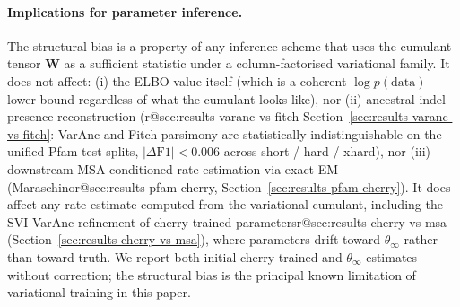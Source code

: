 \paragraph{Implications for parameter inference.}
The structural bias is a property of any inference scheme that
uses the cumulant tensor $\mathbf{W}$ as a sufficient statistic
under a column-factorised variational family.  It does not affect:
(i) the ELBO value itself (which is a coherent $\log p(\text{data})$
lower bound regardless of what the cumulant looks like), nor
(ii) ancestral indel-presence reconstruction
(\ifcsname r@sec:results-varanc-vs-fitch\endcsname
Section~\ref{sec:results-varanc-vs-fitch}: \fi VarAnc and Fitch
parsimony are statistically indistinguishable on the unified
Pfam test splits, $|\Delta\text{F1}| < 0.006$ across short / hard
/ xhard), nor
(iii) downstream MSA-conditioned rate estimation via
exact-EM (Maraschino\ifcsname r@sec:results-pfam-cherry\endcsname,
Section~\ref{sec:results-pfam-cherry}\fi).
It does affect any rate estimate computed from the variational
cumulant, including the SVI-VarAnc refinement of cherry-trained
parameters\ifcsname r@sec:results-cherry-vs-msa\endcsname{}
(Section~\ref{sec:results-cherry-vs-msa})\fi, where
parameters drift toward $\theta_\infty$ rather than toward
truth.  We report both initial cherry-trained and $\theta_\infty$
estimates without correction; the structural bias is the principal
known limitation of variational training in this paper.
